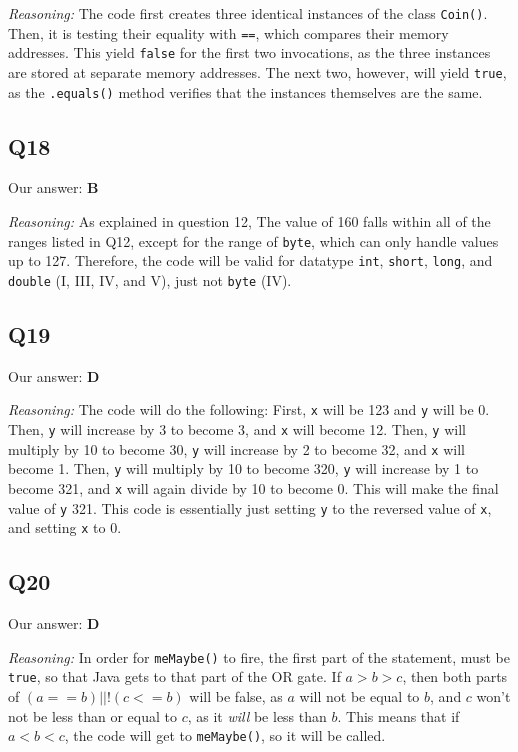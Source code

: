 \documentclass{article}
\begin{document}
\noindent\textit{Reasoning:} The code first creates three identical instances of the class \verb|Coin()|. Then, it is testing their equality with \verb|==|, which compares their memory addresses. This yield \verb|false| for the first two invocations, as the three instances are stored at separate memory addresses. The next two, however, will yield \verb|true|, as the \verb|.equals()| method verifies that the instances themselves are the same.

\subsection{Q18}

Our answer: \textbf{B}

\noindent\textit{Reasoning:} As explained in question 12, The value of 160 falls within all of the ranges listed in Q12, except for the range of \verb|byte|, which can only handle values up to 127. Therefore, the code will be valid for datatype \verb|int|, \verb|short|, \verb|long|, and \verb|double| (I, III, IV, and V), just not \verb|byte| (IV).

\subsection{Q19}

Our answer: \textbf{D}

\noindent\textit{Reasoning:} The code will do the following:
First, \verb|x| will be 123 and \verb|y| will be 0. Then, \verb|y| will increase by 3 to become 3, and \verb|x| will become 12. Then, \verb|y| will multiply by 10 to become 30, \verb|y| will increase by 2 to become 32, and \verb|x| will become 1. Then, \verb|y| will multiply by 10 to become 320, \verb|y| will increase by 1 to become 321, and \verb|x| will again divide by 10 to become 0. This will make the final value of \verb|y| 321. This code is essentially just setting \verb|y| to the reversed value of \verb|x|, and setting \verb|x| to 0.

\subsection{Q20}

Our answer: \textbf{D}

\noindent\textit{Reasoning:} In order for \verb|meMaybe()| to fire, the first part of the statement, must be \verb|true|, so that Java gets to that part of the OR gate. If \(a > b > c\), then both parts of \((a==b) || !(c<=b)\) will be false, as \(a\) will not be equal to \(b\), and \(c\) won't not be less than or equal to \(c\), as it \textit{will} be less than \(b\). This means that if \(a < b < c\), the code will get to \verb|meMaybe()|, so it will be called.
\end{document}
